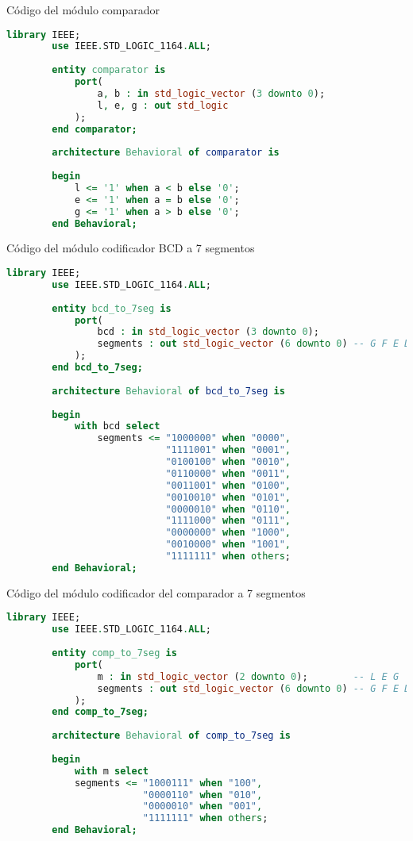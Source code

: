 \documentclass[a4paper, 12pt]{article}
\begin{document}
    Código del módulo comparador
    \begin{lstlisting}[language=VHDL]
        library IEEE;
        use IEEE.STD_LOGIC_1164.ALL;
        
        entity comparator is
            port(
                a, b : in std_logic_vector (3 downto 0);
                l, e, g : out std_logic
            );
        end comparator;
        
        architecture Behavioral of comparator is
        
        begin
            l <= '1' when a < b else '0';
            e <= '1' when a = b else '0';
            g <= '1' when a > b else '0';
        end Behavioral;
    \end{lstlisting}

    Código del módulo codificador BCD a 7 segmentos
    \begin{lstlisting}[language=VHDL]
        library IEEE;
        use IEEE.STD_LOGIC_1164.ALL;
        
        entity bcd_to_7seg is
            port(
                bcd : in std_logic_vector (3 downto 0);
                segments : out std_logic_vector (6 downto 0) -- G F E D C B A
            );
        end bcd_to_7seg;
        
        architecture Behavioral of bcd_to_7seg is
        
        begin
            with bcd select
                segments <= "1000000" when "0000",
                            "1111001" when "0001",
                            "0100100" when "0010",
                            "0110000" when "0011",
                            "0011001" when "0100",
                            "0010010" when "0101",
                            "0000010" when "0110",
                            "1111000" when "0111",
                            "0000000" when "1000",
                            "0010000" when "1001",
                            "1111111" when others;
        end Behavioral;
    \end{lstlisting}

    Código del módulo codificador del comparador a 7 segmentos
    \begin{lstlisting}[language=VHDL]
        library IEEE;
        use IEEE.STD_LOGIC_1164.ALL;
        
        entity comp_to_7seg is
            port(
                m : in std_logic_vector (2 downto 0);        -- L E G
                segments : out std_logic_vector (6 downto 0) -- G F E D C B A
            );
        end comp_to_7seg;
        
        architecture Behavioral of comp_to_7seg is
        
        begin
            with m select
            segments <= "1000111" when "100",
                        "0000110" when "010",
                        "0000010" when "001",
                        "1111111" when others;
        end Behavioral;
    \end{lstlisting}
\end{document}
